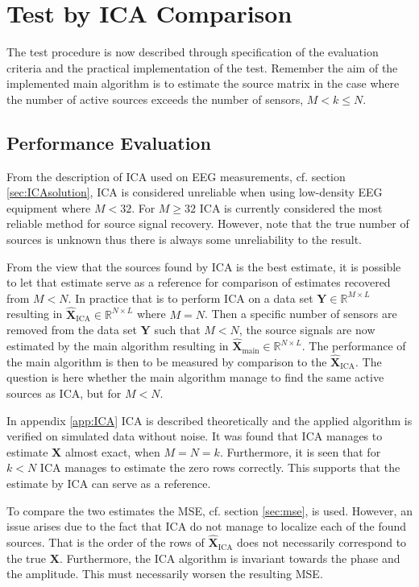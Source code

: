 \section{Test by ICA Comparison}\label{seg:main_test_description}
The test procedure is now described through specification of the evaluation criteria and the practical implementation of the test.
Remember the aim of the implemented main algorithm is to estimate the source matrix in the case where the number of active sources exceeds the number of sensors, $M < k \leq N$.

\subsection{Performance Evaluation}
From the description of ICA used on EEG measurements, cf. section \ref{sec:ICAsolution}, ICA is considered unreliable when using low-density EEG equipment where $M < 32$. 
For $M \geq 32$ ICA is currently considered the most reliable method for  source signal recovery. 
However, note that the true number of sources is unknown thus there is always some unreliability to the result. 

From the view that the sources found by ICA is the best estimate, it is possible to let that estimate serve as a reference for comparison of estimates recovered from $M < N$. 
In practice that is to perform ICA on a data set $\mathbf{Y} \in \mathbb{R}^{M \times L}$ resulting in $\hat{\mathbf{X}}_{\text{ICA}} \in \mathbb{R}^{N \times L}$ where $M = N$. 
Then a specific number of sensors are removed from the data set $\mathbf{Y}$ such that $M < N$, the source signals are now estimated by the main algorithm resulting in $\hat{\textbf{X}}_{\text{main}}\in \mathbb{R}^{N \times L}$. 
The performance of the main algorithm is then to be measured by comparison to the $\hat{\mathbf{X}}_{\text{ICA}}$. 
The question is here whether the main algorithm manage to find the same active sources as ICA, but for $M < N$.

In appendix \ref{app:ICA} ICA is described theoretically and the applied algorithm is verified on simulated data without noise. 
It was found that ICA manages to estimate $\mathbf{X}$ almost exact, when $M = N = k$. 
Furthermore, it is seen that for $k < N$ ICA manages to estimate the zero rows correctly. 
This supports that the estimate by ICA can serve as a reference.     

To compare the two estimates the MSE, cf. section \ref{sec:mse}, is used. 
However, an issue arises due to the fact that ICA do not manage to localize each of the found sources. 
That is the order of the rows of $\hat{\mathbf{X}}_{\text{ICA}}$ does not necessarily correspond to the true $\mathbf{X}$. 
Furthermore, the ICA algorithm is invariant towards the phase and the amplitude. 
This must necessarily worsen the resulting MSE.  

